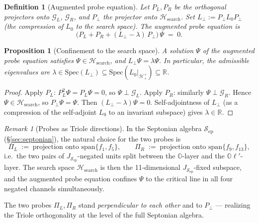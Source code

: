\documentclass[12pt,a4paper]{article}
\newtheorem{proposition}[theorem]{Proposition}
\newtheorem{definition}[theorem]{Definition}
\theoremstyle{remark}
\newtheorem*{remark}{Remark}
\begin{document}
\begin{definition}[Augmented probe equation]\label{def:augmented}
Let $P_L, P_R$ be the orthogonal projectors onto $\mathcal{G}_L$,
$\mathcal{G}_R$, and $P_\perp$ the projector onto
$\mathcal{H}_{\mathrm{search}}$.
Set $L_\perp := P_\perp L_0 P_\perp$ (the compression of $L_0$ to the
search space).
The \emph{augmented probe equation} is
\[
  \bigl(P_L + P_R + (L_\perp - \lambda)\,P_\perp\bigr)\,\Psi \;=\; 0.
\]
\end{definition}

\begin{proposition}[Confinement to the search space]
\label{prop:confinement}
A solution $\Psi$ of the augmented probe equation satisfies
$\Psi \in \mathcal{H}_{\mathrm{search}}$,
and $L_\perp\Psi = \lambda\Psi$.
In particular, the admissible eigenvalues are
$\lambda\in\mathrm{Spec}(L_\perp)\subseteq\mathrm{Spec}(L_0|_{\mathcal{H}^+_+})
\subseteq\mathbb{R}$.
\end{proposition}
\begin{proof}
Apply $P_L$: $P_L^2\Psi = P_L\Psi = 0$, so $\Psi\perp\mathcal{G}_L$.
Apply $P_R$: similarly $\Psi\perp\mathcal{G}_R$.
Hence $\Psi\in\mathcal{H}_{\mathrm{search}}$, so $P_\perp\Psi=\Psi$.
Then $(L_\perp-\lambda)\Psi=0$.
Self-adjointness of $L_\perp$ (as a compression of the self-adjoint $L_0$
to an invariant subspace) gives $\lambda\in\mathbb{R}$.
\end{proof}

\begin{remark}[Probes as Triole directions]
In the Septonian algebra $\mathcal{S}_{\mathrm{ep}}$ (\S\ref{sec:septonian}),
the natural choice for the two probes is
\[
  \Pi_L \;:=\; \text{projection onto }\mathrm{span}\{f_1, f_5\},
  \qquad
  \Pi_R \;:=\; \text{projection onto }\mathrm{span}\{f_9, f_{13}\},
\]
i.e.\ the two pairs of $J_{\mathcal{S}_{\mathrm{ep}}}$-negated units split between
the $\mathbb{O}$-layer and the $\mathbb{O}\ell'$-layer.
The search space $\mathcal{H}_{\mathrm{search}}$ is then the
11-dimensional $J_{\mathcal{S}_{\mathrm{ep}}}$-fixed subspace, and the augmented
probe equation confines $\Psi$ to the critical line in all four
negated channels simultaneously.

The two probes $\Pi_L, \Pi_R$ stand \emph{perpendicular to each other}
and to $P_\perp$ — realizing the Triole orthogonality at the level of
the full Septonian algebra.
\end{remark}

\end{document}
